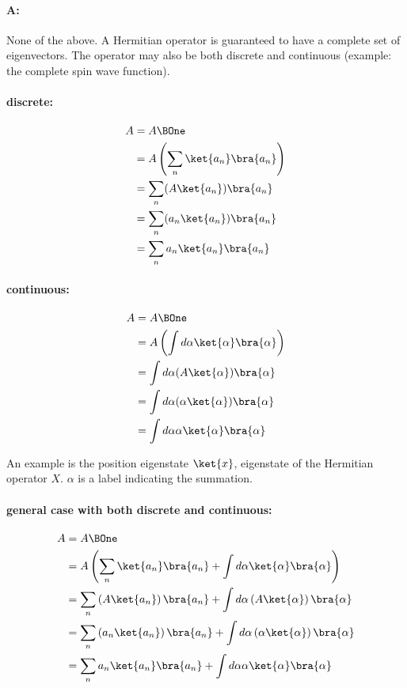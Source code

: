 \paragraph{A:} None of the above.  A Hermitian operator is guaranteed to have a complete set of eigenvectors.  The operator may also be both discrete and continuous (example: the complete spin wave function).

\paragraph{discrete:}

\begin{align*}
A &= A \BOne \\
&= A \left( \sum_n \ket{a_n} \bra{a_n} \right) \\
&= \sum_n (A \ket{a_n} )\bra{a_n} \\
&= \sum_n (a_n \ket{a_n}) \bra{a_n} \\
&= \sum_n a_n \ket{a_n} \bra{a_n}
\end{align*}

\paragraph{continuous:}

\begin{align*}
A &= A \BOne \\
&= A \left( \int d\alpha \ket{\alpha} \bra{\alpha} \right) \\
&= \int d\alpha (A \ket{\alpha} )\bra{\alpha} \\
&= \int d\alpha (\alpha \ket{\alpha}) \bra{\alpha} \\
&= \int d\alpha \alpha \ket{\alpha} \bra{\alpha}
\end{align*}

An example is the position eigenstate $\ket{x}$, eigenstate of the Hermitian operator $X$.  $\alpha$ is a label indicating the summation.

\paragraph{general case with both discrete and continuous:}

\begin{align*}
A &= A \BOne \\
&= A \left( \sum_n \ket{a_n} \bra{a_n} + \int d\alpha \ket{\alpha} \bra{\alpha} \right) \\
&= \sum_n \left(A \ket{a_n} \right)\bra{a_n} + \int d\alpha \left(A \ket{\alpha} \right)\bra{\alpha} \\
&= \sum_n \left(a_n \ket{a_n}\right) \bra{a_n} + \int d\alpha \left(\alpha \ket{\alpha}\right) \bra{\alpha} \\
&= \sum_n a_n \ket{a_n} \bra{a_n} + \int d\alpha \alpha \ket{\alpha} \bra{\alpha}
\end{align*}

